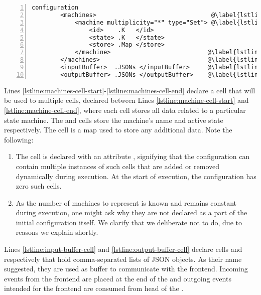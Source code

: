\begin{lstlisting}[float=ht,
  frame=single,
  style=ksty,
  language=k,
  numbers=left,
  numbersep=5pt,
  caption={Initial Configuration},
  label={lst:initial-configuration},
  xleftmargin=3ex
]
    configuration
        <machines>                                @\label{lstline:machines-cell-start}@
            <machine multiplicity="*" type="Set"> @\label{lstline:machine-cell-start}@
                <id>    .K   </id>
                <state> .K   </state>
                <store> .Map </store>
            </machine>                           @\label{lstline:machine-cell-end}@
        </machines>                              @\label{lstline:machines-cell-end}@
        <inputBuffer>  .JSONs </inputBuffer>     @\label{lstline:input-buffer-cell}@
        <outputBuffer> .JSONs </outputBuffer>    @\label{lstline:output-buffer-cell}@
\end{lstlisting}

Lines \ref{lstline:machines-cell-start}-\ref{lstline:machines-cell-end} declare
a cell  that will be used to multiple
 cells, declared between Lines
\ref{lstline:machine-cell-start} and \ref{lstline:machine-cell-end}, where
each cell stores all data related to a particular state machine. The
 and  cells store the machine's name and
active state respectively. The  cell
is a map used to store any additional data. Note the following:
\begin{enumerate}[label=(\roman*)]
  \item The  cell is declared with an attribute
    , signifying that the configuration can contain
    multiple instances of such cells that are added or removed dynamically
    during execution. At the start of execution, the configuration has
    zero such cells.
  \item As the number of machines to represent is known and remains constant
    during execution, one might ask why they are not declared as a part of the
    initial configuration itself. We clarify that we deliberate not to do, due
    to reasons we explain shortly.
\end{enumerate}

Lines \ref{lstline:input-buffer-cell} and \ref{lstline:output-buffer-cell}
declare cells  and  respectively
that hold comma-separated lists of
JSON objects. As their name suggested, they are used as buffer to communicate with
the frontend. Incoming events from the
frontend are placed at the end of the  and outgoing
events intended for the frontend are consumed from head of the .

